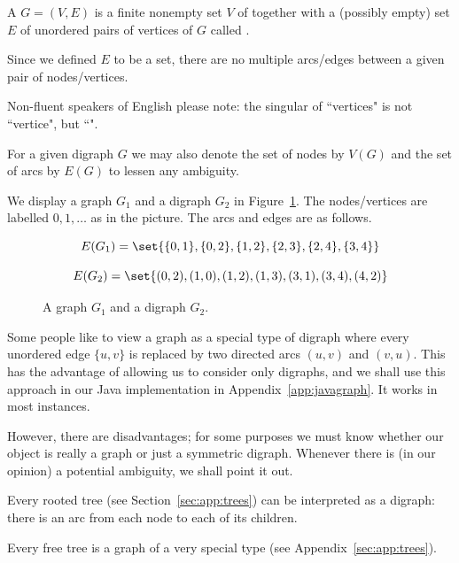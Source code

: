 \begin{Definition}\label{def:graph}
A  $G=(V,E)$ is a finite nonempty  set $V$ of 
 together with a (possibly empty) set $E$ of unordered
pairs of vertices of $G$ called .
\end{Definition}

\begin{note}
Since we defined $E$ to be a set, there are no multiple arcs/edges
between a given pair of nodes/vertices.

Non-fluent speakers of English please note: the singular of ``vertices" is not
``vertice", but ``".

For a given digraph $G$ we may also denote the set of nodes by $V(G)$
and the set of arcs by $E(G)$ to lessen any ambiguity.
\end{note}

\begin{Example}
\label{eg:graphExample}
We display a graph $G_1$ and a digraph $G_2$ in
Figure~\ref{fig:graphExample}. The
nodes/vertices are labelled $0, 1, \dots $ as in the picture. The arcs
and edges are as follows.

$$E(G_1) = \set{\{0,1\},\{0,2\},\{1,2\},\{2,3\},\{2,4\},\{3,4\}}$$

$$E(G_2) = \set{(0,2),(1,0),(1,2),(1,3),(3,1),(3,4),(4,2)}$$


\begin{figure}
\centerline{}
\caption{A graph $G_1$ and a digraph $G_2$.}
\label{fig:graphExample}
\end{figure}
\end{Example}

\begin{note} 
Some people like to view a graph as a special type of digraph where
every unordered edge $\{u,v\}$ is replaced by two directed arcs $(u,v)$
and $(v,u)$.  This has the advantage of allowing us to consider only
digraphs, and we shall use this approach in our Java implementation in Appendix~\ref{app:javagraph}. 
It works in most instances.

However, there are disadvantages; for some purposes we must know whether
our object is really a graph or just a symmetric digraph. Whenever there
is (in our opinion) a potential ambiguity, we shall point it out.
\end{note}

\begin{Example}
Every rooted tree (see Section~\ref{sec:app:trees}) 
can be interpreted as a digraph: there is an arc from
each node to each of its children.  

Every free tree is a graph of a very special type (see
Appendix~\ref{sec:app:trees}). 
\end{Example}

